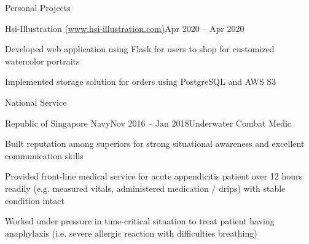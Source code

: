 \documentclass{resume} %
\begin{document}
\begin{rSection}{Personal Projects}

\begin{rSubsection}{Hsi-Illustration \href{https://www.hsi-illustration.com}{(www.hsi-illustration.com)}}{Apr 2020 – Apr 2020}{}{}
\item Developed web application using Flask for users to shop for customized watercolor portraits
\item Implemented storage solution for orders using PostgreSQL and AWS S3

\end{rSubsection}
    
\end{rSection}


\begin{rSection}{National Service}

\begin{rSubsection}{Republic of Singapore Navy}{Nov 2016 – Jan 2018}{Underwater Combat Medic}{}
\item Built reputation among superiors for strong situational awareness and excellent communication skills
\item Provided front-line medical service for acute appendicitis patient over 12 hours readily (e.g. measured vitals, administered medication / drips) with stable condition intact
\item Worked under pressure in time-critical situation to treat patient having anaphylaxis (i.e. severe allergic reaction with difficulties breathing)

\end{rSubsection}
    
\end{rSection}

\end{document}
